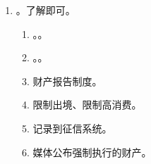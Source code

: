 \begin{enumerate}
\begin{enumerate}
\begin{enumerate}
                        \begin{enumerate}
                          \item {}。
                          \item {}。
                          \item 第三人向法院给付剩余价款（） \yjt 法院解除查扣冻 \yjt 继续履行合同。本质第三人代为履行。
                        \end{enumerate}
                  \item 被执行人购买第三人财产。没考过。
                        。
                        \begin{enumerate}
                          \item {}要钱。（登记对抗）。
                          \item {}要物。。
                        \end{enumerate}
                \end{enumerate}
          \item 赔礼道歉、恢复名誉。判决的主文在媒体上公告。这两一般只针对人格侵权。。
          \item 逾期/迟延履行。简单记，行为给钱，钱生钱。
                \begin{enumerate}
                  \item 行为义务。迟延履行金、双倍补偿损失。
                  \item 金钱义务。加倍支付迟延履行期间债务利息。
                \end{enumerate}
        \end{enumerate}
  \item {}。了解即可。
        \begin{enumerate}
          \item {}。。
          \item {}。。
          \item 财产报告制度。
          \item 限制出境、限制高消费。
          \item 记录到征信系统。
          \item 媒体公布强制执行的财产。
        \end{enumerate}
\end{enumerate}
